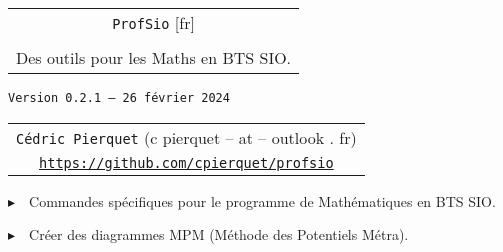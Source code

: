 \documentclass[french,a4paper,11pt]{article}
\def\TPversion{0.2.1}
\def\TPdate{26 février 2024}
\begin{document}
\setlength{\aweboxleftmargin}{0.07\linewidth}
\setlength{\aweboxcontentwidth}{0.93\linewidth}
\setlength{\aweboxvskip}{8pt}

\pagestyle{fancy}

\thispagestyle{empty}

\vspace{2cm}

\begin{center}
	\begin{minipage}{0.75\linewidth}
	\begin{tcolorbox}[colframe=yellow,colback=yellow!15]
		\begin{center}
			\begin{tabular}{c}
				{\Huge \texttt{ProfSio} [fr]}\\
				\\
				{\LARGE Des outils pour les Maths en BTS SIO.} \\
			\end{tabular}
			
			\bigskip
			
			{\small \texttt{Version \TPversion{} -- \TPdate}}
		\end{center}
	\end{tcolorbox}
\end{minipage}
\end{center}

\begin{center}
	\begin{tabular}{c}
	\texttt{Cédric Pierquet} ({\ttfamily c pierquet -- at -- outlook . fr})\\
	\texttt{\url{https://github.com/cpierquet/profsio}}
\end{tabular}
\end{center}

\vspace{0.15cm}

{$\blacktriangleright$~~Commandes spécifiques pour le programme de Mathématiques en BTS SIO\footnotemark{}.}

\vspace{0.15cm}

{$\blacktriangleright$~~Créer des diagrammes MPM\footnotemark{} (Méthode des Potentiels Métra).}
\end{document}
